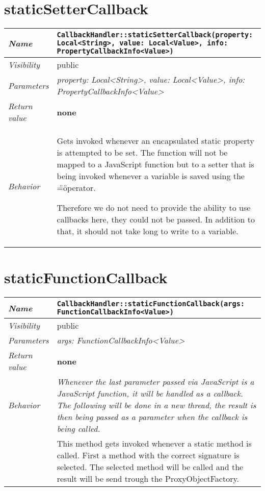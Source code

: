  \section{staticSetterCallback}
\begin{longtable}{p{3cm} @{\hskip 1cm} p{12cm}}
 \hline
\textit{Name} & \texttt{CallbackHandler::staticSetterCallback(property: Local<String>, value: Local<Value>, info: PropertyCallbackInfo<Value>)}\\
\hline
 \textit{Visibility} & public\\
\hline
\textit{Parameters} & \textit{property: Local<String>, value: Local<Value>, info: PropertyCallbackInfo<Value>}\\
\hline
\textit{Return value} & \textbf{none}\\
  \hline
 \textit{Behavior} & Gets invoked whenever an encapsulated static property is attempted to be set. The function will not be mapped to a JavaScript function but to a setter that is being invoked whenever a variable is saved using the \"=\" operator.

 Therefore we do not need to provide the ability to use callbacks here, they could not be passed. In addition to that, it should not take long to write to a variable. \\
\hline
\end{longtable} \pagebreak
 \section{staticFunctionCallback}
\begin{longtable}{p{3cm} @{\hskip 1cm} p{12cm}}
 \hline
\textit{Name} & \texttt{CallbackHandler::staticFunctionCallback(args: FunctionCallbackInfo<Value>)}\\
\hline
 \textit{Visibility} & public\\
\hline
\textit{Parameters} & \textit{args: FunctionCallbackInfo<Value>}\\
\hline
\textit{Return value} & \textbf{none}\\
  \hline
 \textit{Behavior} & \textit{Whenever the last parameter passed via JavaScript is a JavaScript function, it will be handled as a callback. The following will be done in a new thread, the result is then being passed as a parameter when the callback is being called.}\\

 & This method gets invoked whenever a static method is called. First a method with the correct signature is selected.
 The selected method will be called and the result will be send trough the ProxyObjectFactory. \\
\hline
\end{longtable} \pagebreak

